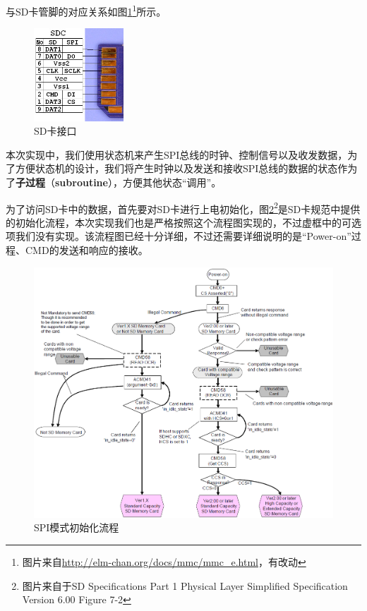 \documentclass[11pt,utf8]{report}
\begin{document}
	与SD卡管脚的对应关系如图\ref{sd}\footnote{图片来自\url{http://elm-chan.org/docs/mmc/mmc\_e.html}，有改动}所示。
	
	\begin{figure}[h!]
		\centering
		\includegraphics[width=0.3\textwidth]{sd}
		\caption{SD卡接口}
		\label{sd}
	\end{figure}
	
	\par 本次实现中，我们使用状态机来产生SPI总线的时钟、控制信号以及收发数据，为了方便状态机的设计，我们将产生时钟以及发送和接收SPI总线的数据的状态作为了\textbf{子过程}（\textbf{subroutine}），方便其他状态“调用”。
	
	\par 为了访问SD卡中的数据，首先要对SD卡进行上电初始化，图\ref{spi_init}\footnote{图片来自于SD Specifications Part 1 Physical Layer Simplified Specification Version 6.00 Figure 7-2}是SD卡规范中提供的初始化流程，本次实现我们也是严格按照这个流程图实现的，不过虚框中的可选项我们没有实现。该流程图已经十分详细，不过还需要详细说明的是“Power-on”过程、CMD的发送和响应的接收。
	
	\begin{figure}[h!]
		\centering
		\includegraphics[width=\textwidth]{spi_init}
		\caption{SPI模式初始化流程}
		\label{spi_init}
	\end{figure}
	
\end{document}
